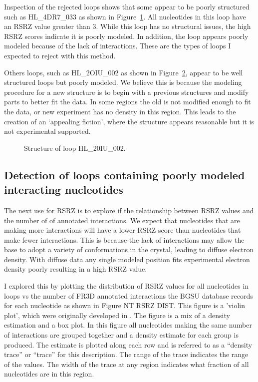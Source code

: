 Inspection of the rejected loops shows that some appear to be poorly structured
such as HL\_4DR7\_033 as shown in Figure~\ref{fig:hl-4dr7-033}. All nucleotides
in this loop have an RSRZ value greater than 3. While this loop has no
structural issues, the high RSRZ scores indicate it is poorly modeled. In
addition, the loop appears poorly modeled because of the lack of interactions.
These are the types of loops I expected to reject with this method.

\begin{figure}
  \caption{}
  \label{fig:hl-4dr7-033}
\end{figure}
 
Others loops, such as HL\_2OIU\_002 as shown in Figure~\ref{fig:hl-20iu-002},
appear to be well structured loops but poorly modeled. We believe this is
because the modeling procedure for a new structure is to begin with a previous
structures and modify parts to better fit the data. In some regions the old is
not modified enough to fit the data, or new experiment has no density in this
region. This leads to the creation of an ‘appealing fiction’, where the
structure appears reasonable but it is not experimental supported.

\begin{figure}
  \caption{Structure of loop HL\_20IU\_002.}
  \label{fig:hl-20iu-002}
\end{figure}

\subsection{Detection of loops containing poorly modeled interacting nucleotides}

The next use for RSRZ is to explore if the relationship between RSRZ values and
the number of of annotated interactions. We expect that nucleotides that are
making more interactions will have a lower RSRZ score than nucleotides that make
fewer interactions. This is because the lack of interactions may allow the base
to adopt a variety of conformations in the crystal, leading to diffuse electron
density. With diffuse data any single modeled position fits experimental
electron density poorly resulting in a high RSRZ value. 

I explored this by plotting the distribution of RSRZ values for all nucleotides
in loops vs the number of FR3D annotated interactions the BGSU database records
for each nucleotide as shown in Figure NT RSRZ DIST. This figure is a 'violin
plot', which were originally developed in \cite{Hintze1998}. The figure is a mix
of a density estimation and a box plot. In this figure all nucleotides making
the same number of interactions are grouped together and a density estimate for
each group is produced. The estimate is plotted along each row and is referred
to as a ``density trace'' or ``trace'' for this description. The range of the trace
indicates the range of the values. The width of the trace at any region
indicates what fraction of all nucleotides are in this region.

